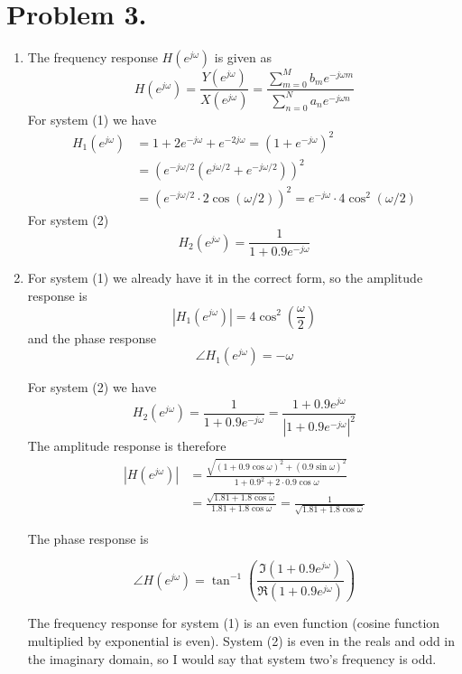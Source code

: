 \documentclass[a4paper,11pt,norsk]{article}
\begin{document}
\section*{Problem 3.}
\begin{enumerate}
    \item The frequency response $H(e^{j\omega})$ is given as 
        \[
            H(e^{j\omega}) = \frac{Y(e^{j\omega})}{X(e^{j\omega})} = \frac{\sum_{m=0}^{M} b_m e^{-j\omega m}}{\sum_{n=0}^{N} a_n e^{-j\omega n}}
        \]
        For system (1) we have
        \begin{align*}
            H_1(e^{j\omega}) &= 1 + 2e^{-j\omega} + e^{-2j\omega} = (1 + e^{-j\omega})^2 \\
                           &= \left(e^{-j\omega/2}(e^{j\omega/2} + e^{-j\omega/2}) \right)^2\\
                           &= \left(e^{-j\omega/2} \cdot 2\cos(\omega / 2)\right)^2 = e^{-j\omega} \cdot 4\cos^2(\omega/2)
        \end{align*}
        For system (2)
        \[
            H_2(e^{j\omega}) = \frac{1}{1 + 0.9e^{-j\omega}}
        \]

    \item For system (1) we already have it in the correct form, so the amplitude response is
        \[
            \left|H_1(e^{j\omega})\right| = 4\cos^2\left(\frac{\omega}{2}\right)
        \]
        and the phase response
        \[
            \angle H_1(e^{j\omega}) = -\omega
        \]

        For system (2) we have 
        \[
            H_2(e^{j\omega}) = \frac{1}{1 + 0.9e^{-j\omega}} = \frac{1 + 0.9e^{j\omega}}{|1 + 0.9e^{-j\omega}|^2}
        \]
        The amplitude response is therefore 
        \begin{align*}
            |H(e^{j\omega})| &= \frac{\sqrt{(1 + 0.9\cos \omega)^2 + (0.9 \sin \omega)^2}}{1 + 0.9^2 + 2 \cdot 0.9\cos \omega} \\
                             &= \frac{\sqrt{1.81 + 1.8 \cos\omega}}{1.81 + 1.8\cos\omega} = \frac{1}{\sqrt{1.81 + 1.8\cos\omega}}
        \end{align*}

        The phase response is 

        \[
            \angle H(e^{j\omega}) = \tan^{-1}\left(\frac{\Im(1 + 0.9e^{j\omega})}{\Re(1 + 0.9e^{j\omega})}\right)
        \]

        The frequency response for system (1) is an even function (cosine function multiplied by exponential is even). System (2) 
        is even in the reals and odd in the imaginary domain, so I would say that system two's frequency is odd.


\end{enumerate}
\end{document}
